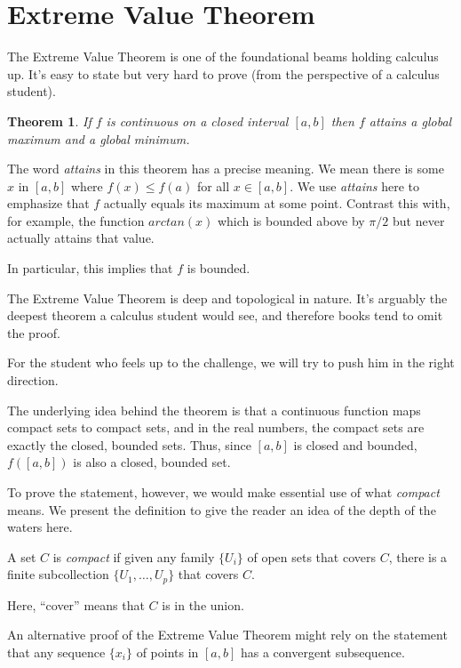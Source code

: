 \documentclass[11pt]{book}
\newtheorem{theorem}{Theorem}
\newenvironment{definition}[1][Definition]{\begin{trivlist}
\item[\hskip \labelsep {\bfseries #1}]}{\end{trivlist}}
\numberwithin{example}{chapter}
\begin{document}
\section{Extreme Value Theorem}


The Extreme Value Theorem is one of the foundational beams holding calculus up.  It's easy to state but very hard to prove (from the perspective of a calculus student).

\begin{theorem}
If $f$ is continuous on a closed interval $[a,b]$ then $f$ attains a global maximum and a global minimum.  
\end{theorem}

The word \emph{attains} in this theorem has a precise meaning.  We mean there is some $x$ in $[a,b]$ where $f(x)\leq f(a)$ for all $x\in [a,b]$.  We use \emph{attains} here to emphasize that $f$ actually equals its maximum at some point.  Contrast this with, for example, the function $arctan(x)$ which is bounded above by $\pi/2$ but never actually attains that value.  

In particular, this implies that $f$ is bounded.  

The Extreme Value Theorem is deep and topological in nature.  It's arguably the deepest theorem a calculus student would see, and therefore books tend to omit the proof.  

For the student who feels up to the challenge, we will try to push him in the right direction. 

The underlying idea behind the theorem is that a continuous function maps compact sets to compact sets, and in the real numbers, the compact sets are exactly the closed, bounded sets.  Thus, since $[a,b]$ is closed and bounded, $f([a,b])$ is also a closed, bounded set.

To prove the statement, however, we would make essential use of what \emph{compact} means.  We present the definition to give the reader an idea of the depth of the waters here.

\begin{definition}
A set $C$ is \emph{compact} if given any family $\{U_i\}$ of open sets that covers $C$, there is a finite subcollection $\{U_1, \ldots, U_p\}$ that covers $C$.  
\end{definition}

Here, ``cover'' means that $C$ is in the union.  


An alternative proof of the Extreme Value Theorem might rely on the statement that any sequence $\{x_i\}$ of points in $[a,b]$ has a convergent subsequence.  
\end{document}
